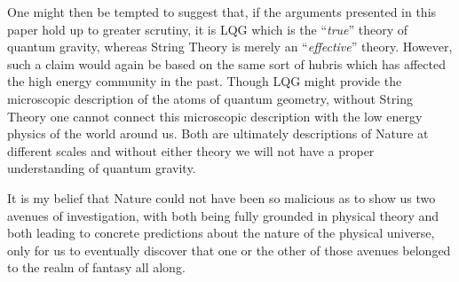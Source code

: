 \documentclass{ws-mpla}
\begin{document}
One might then be tempted to suggest that, if the arguments presented in this paper hold up to greater scrutiny, it is LQG which is the ``\emph{true}'' theory of quantum gravity, whereas String Theory is merely an ``\emph{effective}'' theory. However, such a claim would again be based on the same sort of hubris which has affected the high energy community in the past. Though LQG might provide the microscopic description of the atoms of quantum geometry, without String Theory one cannot connect this microscopic description with the low energy physics of the world around us. Both are ultimately descriptions of Nature at different scales and without either theory we will not have a proper understanding of quantum gravity.


It is my belief that Nature could not have been so malicious as to show us two avenues of investigation, with both being fully grounded in physical theory and both leading to concrete predictions about the nature of the physical universe, only for us to eventually discover that one or the other of those avenues belonged to the realm of fantasy all along.
\end{document}
